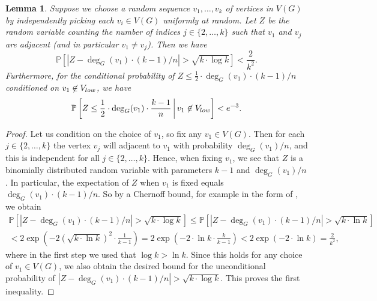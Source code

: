 \documentclass[11pt]{article}
\newtheorem{lemma}[theorem]{Lemma}
\theoremstyle{definition}
\numberwithin{equation}{section}
\begin{document}
\begin{lemma}\label{lemma-Chernoff-sequence-G} Suppose we choose a random sequence $v_1,\dots,v_k$ of vertices in $V(G)$ by independently picking each $v_i\in V(G)$ uniformly at random. Let $Z$ be the random variable counting the number of indices $j\in \lbrace 2,\dots,k\rbrace$ such that $v_1$ and $v_j$ are adjacent (and in particular $v_1\neq v_j$). Then we have
\[\mathbb{P}\left[\left\vert Z-\deg_G(v_1)\cdot (k-1)/n\right\vert> \sqrt{k\cdot \log k}\right]<\frac{2}{k^2}.\]
Furthermore, for the conditional probability of $Z\leq \frac{1}{2}\cdot \deg_G(v_1)\cdot (k-1)/n$ conditioned on $v_1\not\in V_{\textnormal{low}}$, we have
\[\mathbb{P}\left[ Z\leq \frac{1}{2}\cdot \deg_G(v_1)\cdot \frac{k-1}{n}\,\bigg\vert\, v_1\not\in V_{\textnormal{low}}\right]<e^{-3}.\]
\end{lemma}
\begin{proof}Let us condition on the choice of $v_1$, so fix any $v_1\in V(G)$. Then for each $j\in \lbrace 2,\dots,k\rbrace$ the vertex $v_j$ will adjacent to $v_1$ with probability $\deg_G(v_1)/n$, and this is independent for all $j\in \lbrace 2,\dots,k\rbrace$. Hence, when fixing $v_1$, we see that $Z$ is a binomially distributed random variable with parameters $k-1$ and $\deg_G(v_1)/n$. In particular, the expectation of $Z$ when $v_1$ is fixed equals $\deg_G(v_1)\cdot (k-1)/n$. So by a Chernoff bound, for example in the form of \cite[Corollary A.1.7]{alon-spencer}, we obtain
\begin{multline*}
\mathbb{P}\left[\left\vert Z-\deg_G(v_1)\cdot (k-1)/n\right\vert> \sqrt{k\cdot \log k}\right]\leq \mathbb{P}\left[\left\vert Z-\deg_G(v_1)\cdot (k-1)/n\right\vert> \sqrt{k\cdot \ln k}\right]\\
<2\exp\left(-2\left(\sqrt{k\cdot \ln k}\right)^2\cdot \frac{1}{k-1}\right)=2\exp\left(-2\cdot \ln k\cdot \frac{k}{k-1}\right)<2\exp\left(-2\cdot \ln k\right)=\frac{2}{k^2},
\end{multline*}
where in the first step we used that $\log k>\ln k$. Since this holds for any choice of $v_1\in V(G)$, we also obtain the desired bound for the unconditional probability of $\left\vert Z-\deg_G(v_1)\cdot (k-1)/n\right\vert> \sqrt{k\cdot \log k}$. This proves the first inequality.


\end{proof}
\end{document}
